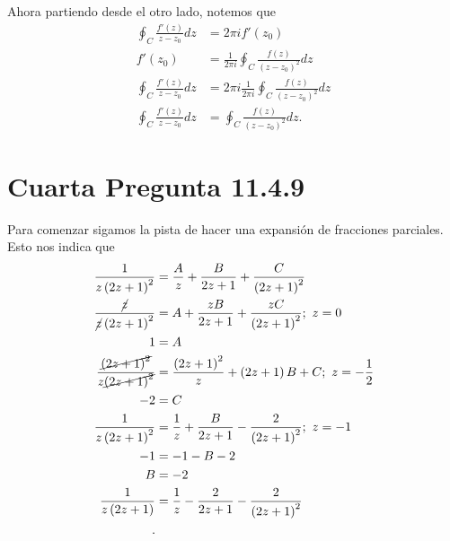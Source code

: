 \documentclass{report}
\begin{document}
Ahora partiendo desde el otro lado, notemos que 
\begin{align*}
  \oint_C \frac{f'\left( z \right) }{z - z_0}dz &= 2\pi i f'\left( z_0 \right) \\
  f'\left( z_0 \right) &= \frac{1}{2\pi i}\oint_C \frac{f\left( z \right) }{\left( z - z_0 \right)^{2} }dz  \\
  \oint_C \frac{f'\left( z \right) }{z - z_0}dz &= 2\pi i\frac{1}{2\pi i}\oint_C \frac{f\left( z \right) }{\left( z - z_0 \right)^{2} }dz  \\
  \oint_C \frac{f'\left( z \right) }{z - z_0}dz &= \oint_C \frac{f\left( z \right) }{\left( z - z_0 \right)^2}dz
.\end{align*}

\chapter{Cuarta Pregunta 11.4.9}
\label{chap:4}


Para comenzar sigamos la pista de hacer una expansión de fracciones parciales. Esto nos indica que 
\begin{align*}
  \frac{1}{z\left( 2z + 1 \right)^2} &= \frac{A}{z} + \frac{B}{2z + 1} + \frac{C}{ \left( 2z + 1 \right)^2} \\
  \frac{\cancel{z}}{\cancel{z}\left( 2z + 1 \right)^2} &= A + \frac{zB}{2z + 1} + \frac{zC}{\left( 2z + 1 \right)^2};\ z = 0 \\
  1 &= A \\
\frac{\cancel{\left( 2z + 1 \right)^2}}{z \cancel{\left( 2z + 1 \right)^2}} &= \frac{\left( 2z + 1 \right)^2}{z} + \left( 2z + 1 \right) B + C;\ z = -\frac{1}{2}\\
-2 &= C \\
\frac{1}{z\left( 2z + 1 \right)^2} &= \frac{1}{z} + \frac{B}{2z + 1} - \frac{2}{\left( 2z + 1 \right)^2};\ z = -1 \\
-1 &= -1 - B - 2\\
B &= -2 \\
\frac{1}{z\left( 2z + 1 \right) } &= \frac{1}{z} - \frac{2}{2z + 1} - \frac{2}{\left( 2z + 1 \right)^2} \\
.\end{align*}
\end{document}
